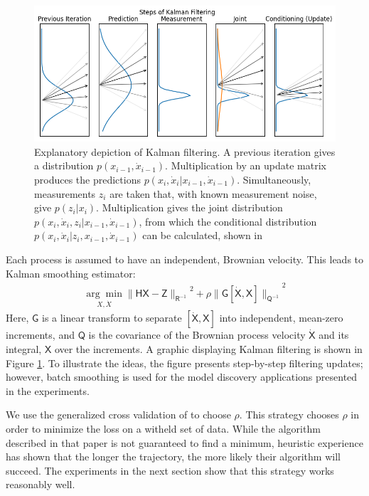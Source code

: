 \documentclass{ACCESS_latex_template_20231118/ieeeaccess}
\newcommand{\mat}[1]{\boldsymbol{\mathsf{#1}}}
\begin{document}
\begin{figure}
    \label{fig:kalman}
    \centering
    \includegraphics[width=\textwidth]{images/static/kalman_fit_demo2.png}
    \caption{Explanatory depiction of Kalman filtering.
    A previous iteration gives a distribution $p(x_{i-1},\dot x_{i-1})$.
    Multiplication by an update matrix produces the predictions $p(x_i, \dot x_i|x_{i-1}, \dot x_{i-1})$.
    Simultaneously, measurements $z_i$ are taken that, with known measurement noise, give $p(z_i|x_i)$.
    Multiplication gives the joint distribution $p(x_i, \dot x_i, z_i| x_{i-1}, \dot x_{i-1})$, from which the conditional distribution $p(x_i, \dot x_i|z_i, x_{i-1}, \dot x_{i-1})$ can be calculated, shown in \cite{Eaton2007}}
\end{figure}


Each process is assumed to have an independent, Brownian velocity.  This leads to Kalman smoothing estimator:
\begin{align}
    \label{eqn:kalman}
    \underset{X, \dot X}{\arg\min}{\|\mat H \mat X - \mat Z\|_{\mat R^{-1}}}^2 + \rho {\|\mat G [\mat {\dot X}, \mat X]\|_{\mat Q^{-1}}}^2
\end{align}
Here, $\mat G$ is a linear transform to separate $[\mat{\dot X}, \mat X]$ into independent, mean-zero increments, and $\mat Q$ is the covariance of the Brownian process velocity $\mat{\dot X}$ and its integral, $\mat X$ over the increments.  A graphic displaying Kalman filtering is shown in Figure \ref{fig:kalman}.  To illustrate the ideas, the figure presents step-by-step  filtering updates; however,  batch smoothing is used for the model discovery applications presented in the experiments.

We use the generalized cross validation of \cite{Barratt2020} to choose $\rho$.  This strategy chooses $\rho$ in order to minimize the loss on a witheld set of data.  While the algorithm described in that paper is not guaranteed to find a minimum, heuristic experience has shown that the longer the trajectory, the more likely their algorithm will succeed.  The experiments in the next section show that this strategy works reasonably well.
\end{document}
